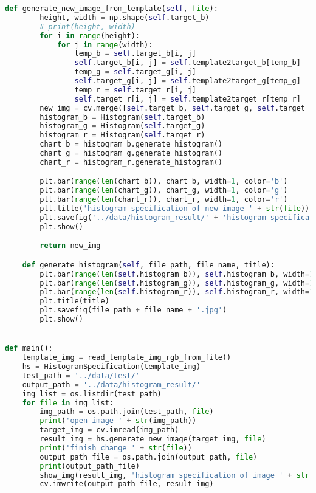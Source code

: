 \documentclass{hitreport}
\begin{document}
\begin{appendices}
\begin{lstlisting}[language=python]
    def generate_new_image_from_template(self, file):
        height, width = np.shape(self.target_b)
        # print(height, width)
        for i in range(height):
            for j in range(width):
                temp_b = self.target_b[i, j]
                self.target_b[i, j] = self.template2target_b[temp_b]
                temp_g = self.target_g[i, j]
                self.target_g[i, j] = self.template2target_g[temp_g]
                temp_r = self.target_r[i, j]
                self.target_r[i, j] = self.template2target_r[temp_r]
        new_img = cv.merge([self.target_b, self.target_g, self.target_r])
        histogram_b = Histogram(self.target_b)
        histogram_g = Histogram(self.target_g)
        histogram_r = Histogram(self.target_r)
        chart_b = histogram_b.generate_histogram()
        chart_g = histogram_g.generate_histogram()
        chart_r = histogram_r.generate_histogram()

        plt.bar(range(len(chart_b)), chart_b, width=1, color='b')
        plt.bar(range(len(chart_g)), chart_g, width=1, color='g')
        plt.bar(range(len(chart_r)), chart_r, width=1, color='r')
        plt.title('histogram specification of new image ' + str(file))
        plt.savefig('../data/histogram_result/' + 'histogram specification of new image ' + str(file) + '.jpg')
        plt.show()

        return new_img

    def generate_histogram(self, file_path, file_name, title):
        plt.bar(range(len(self.histogram_b)), self.histogram_b, width=1, color='b')
        plt.bar(range(len(self.histogram_g)), self.histogram_g, width=1, color='g')
        plt.bar(range(len(self.histogram_r)), self.histogram_r, width=1, color='r')
        plt.title(title)
        plt.savefig(file_path + file_name + '.jpg')
        plt.show()


def main():
    template_img = read_template_img_rgb_from_file()
    hs = HistogramSpecification(template_img)
    test_path = '../data/test/'
    output_path = '../data/histogram_result/'
    img_list = os.listdir(test_path)
    for file in img_list:
        img_path = os.path.join(test_path, file)
        print('open image ' + str(img_path))
        target_img = cv.imread(img_path)
        result_img = hs.generate_new_image(target_img, file)
        print('finish change ' + str(file))
        output_path_file = os.path.join(output_path, file)
        print(output_path_file)
        show_img(result_img, 'histogram specification of image ' + str(file))
        cv.imwrite(output_path_file, result_img)



\end{lstlisting}
\end{appendices}
\end{document}
